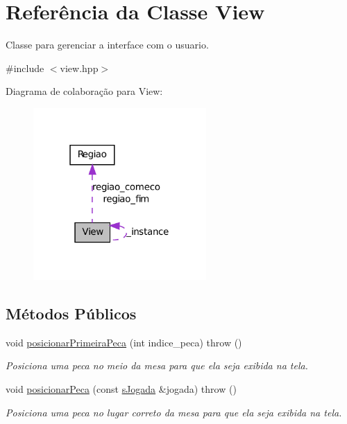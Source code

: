 \hypertarget{classView}{
\section{Referência da Classe View}
\label{classView}
}


Classe para gerenciar a interface com o usuario.  




{\ttfamily \#include $<$view.hpp$>$}



Diagrama de colaboração para View:\nopagebreak
\begin{figure}[H]
\begin{center}
\leavevmode
\includegraphics[width=187pt]{classView__coll__graph}
\end{center}
\end{figure}
\subsection*{Métodos Públicos}
\begin{DoxyCompactItemize}
\item 
void \hyperlink{classView_a00707d8175e595d35408757fc6787437}{posicionarPrimeiraPeca} (int indice\_\-peca)  throw ()
\begin{DoxyCompactList}\small\item\em Posiciona uma peca no meio da mesa para que ela seja exibida na tela. \item\end{DoxyCompactList}\item 
void \hyperlink{classView_a36e0fc2d1a1d032623f75845c2e9f073}{posicionarPeca} (const \hyperlink{structsJogada}{sJogada} \&jogada)  throw ()
\begin{DoxyCompactList}\small\item\em Posiciona uma peca no lugar correto da mesa para que ela seja exibida na tela. \item\end{DoxyCompactList}\end{DoxyCompactItemize}
